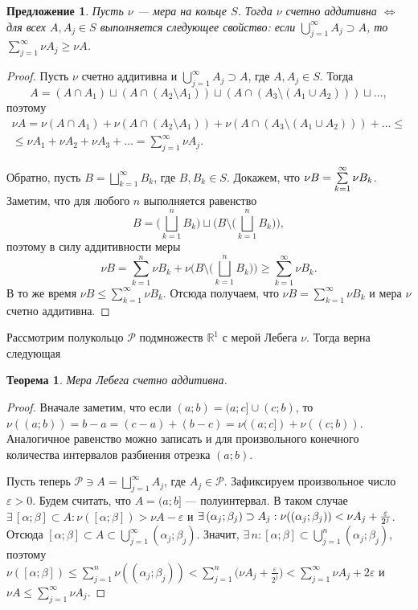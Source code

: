 \documentclass[12pt,titlepage]{article}
\newcounter{tema}
\newtheorem{theorem}{Теорема}[tema]
\newtheorem{predl}{Предложение}[tema]
\theoremstyle{definition}
\newcommand*{\p}[1]{#1\nobreak\discretionary{}{\hbox{$\mathsurround=0pt #1$}}{}}
\begin{document}
\begin{predl}
Пусть $\nu$ --- мера на кольце $S$. Тогда $\nu$ счетно аддитивна
$\Leftrightarrow$ для всех $A, A_j\in S$ выполняется следующее
свойство: если $\bigcup\limits_{j=1}^\infty A_j\supset A$, то
$\sum\limits_{j=1}^\infty \nu A_j\geqslant \nu A$.
\end{predl}

\begin{proof}
Пусть $\nu$ счетно аддитивна и $\bigcup\limits_{j=1}^\infty
A_j\supset A$, где $A, A_j\in S$. Тогда $$A=(A\cap
A_1)\sqcup(A\cap(A_2\setminus A_1))\sqcup(A\cap(A_3\setminus(A_1\cup
A_2)))\sqcup\ldots,$$ поэтому
\begin{multline*}
\nu A=\nu(A\cap A_1)+\nu(A\cap(A_2\setminus
A_1))+\nu(A\cap(A_3\setminus(A_1\cup
A_2)))+\ldots\leqslant\\
\leqslant \nu A_1+\nu A_2+\nu A_3+\ldots=\sum\limits_{j=1}^\infty
\nu A_j.
\end{multline*}

Обратно, пусть $B=\bigsqcup\limits_{k=1}^\infty B_k$, где $B, B_k\in
S$. Докажем, что $\nu B\p=\sum\limits_{k=1}^\infty \nu B_k$.
Заметим, что для любого $n$ выполняется равенство
$$B=\Big(\bigsqcup\limits_{k=1}^n
B_k\Big)\sqcup\Big(B\setminus\Big(\bigsqcup\limits_{k=1}^n
B_k\Big)\Big),$$ поэтому в силу аддитивности меры $$\nu
B=\sum\limits_{k=1}^n \nu
B_k+\nu\Big(B\setminus\Big(\bigsqcup\limits_{k=1}^n
B_k\Big)\Big)\geqslant \sum\limits_{k=1}^\infty \nu B_k.$$ В то же
время $\nu B\leqslant\sum\limits_{k=1}^\infty \nu B_k$. Отсюда
получаем, что $\nu B=\sum\limits_{k=1}^\infty \nu B_k$ и мера $\nu$
счетно аддитивна.
\end{proof}

Рассмотрим полукольцо $\mathcal{P}$ подмножеств $\mathbb{R}^1$ с
мерой Лебега $\nu$. Тогда верна следующая

\begin{theorem}
Мера Лебега счетно аддитивна.
\end{theorem}

\begin{proof}
Вначале заметим, что если $(a;b)=(a;c]\cup(c;b)$, то
$\nu((a;b))=b-a=(c-a)+(b-c)=\nu((a;c])+\nu((c;b))$. Аналогичное
равенство можно записать и для произвольного конечного количества
интервалов разбиения отрезка $(a;b)$.

Пусть теперь $\mathcal{P}\ni A=\bigsqcup\limits_{j=1}^\infty A_j$,
где $A_j\in\mathcal{P}$. Зафиксируем произвольное число
$\varepsilon>0$. Будем считать, что $A=(a;b]$ --- полуинтервал. В
таком случае $\exists\, [\alpha;\beta]\subset A:
\nu([\alpha;\beta])>\nu A-\varepsilon$ и $\exists\,
(\alpha_j;\beta_j)\supset A_j: \nu((\alpha_j;\beta_j))\p<\nu
A_j+\frac{\varepsilon}{2^j}$. Отсюда $[\alpha;\beta]\subset A\subset
\bigcup\limits_{j=1}^\infty(\alpha_j;\beta_j)$. Значит, $\exists\,
n: [\alpha;\beta]\subset\bigcup\limits_{j=1}^n (\alpha_j;\beta_j)$,
поэтому $\nu([\alpha;\beta])\leqslant \sum\limits_{j=1}^n
\nu((\alpha_j;\beta_j))<\sum\limits_{j=1}^n\big(\nu
A_j+\frac{\varepsilon}{2^j}\big)<\sum\limits_{j=1}^\infty \nu A_j +
2\varepsilon$ и $\nu A\leqslant \sum\limits_{j=1}^\infty \nu A_j$.
\end{proof}
\end{document}
